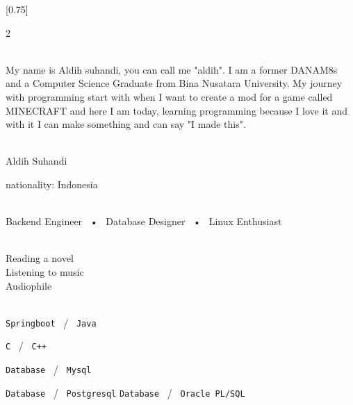 \documentclass[lighthipster]{simplehipstercv}
\begin{document}
\setlength{\columnsep}{1.5cm}
[0.75]
\begin{paracol}{2}

\paracolbackgroundoptions



\footnotesize
{\setasidefontcolour
\flushright
\begin{center}
\end{center}

\\[0.5em]

{\footnotesize
My name is Aldih suhandi, you can call me "aldih". I am a former DANAM8s and a Computer Science Graduate from Bina Nusatara University. My journey with programming start with when I want to create a mod for a game called MINECRAFT and here I am today, learning programming because I love it and with it I can make something and can say "I made this". }
\bigskip

 \\[0.5em]
Aldih Suhandi

nationality: Indonesia

\bigskip

 \\[0.5em]

Backend Engineer ~•~ Database Designer ~•~ Linux Enthusiast

\bigskip



\bigskip

\\[0.5em]
Reading a novel\\
Listening to music\\
Audiophile

\bigskip

\\[0.5em]

\texttt{Springboot} ~/~ \texttt{Java}

\texttt{C} ~/~ \texttt{C++}

\texttt{Database} ~/~ \texttt{Mysql}

\texttt{Database} ~/~ \texttt{Postgresql}
\texttt{Database} ~/~ \texttt{Oracle PL/SQL}



}
\end{paracol}
\end{document}
